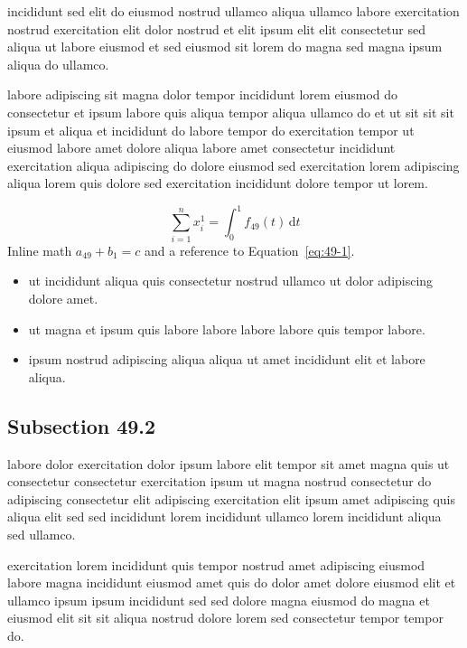 \documentclass{article}
\begin{document}
incididunt sed elit do eiusmod nostrud ullamco aliqua ullamco labore exercitation nostrud exercitation elit dolor nostrud et elit ipsum elit elit consectetur sed aliqua ut labore eiusmod et sed eiusmod sit lorem do magna sed magna ipsum aliqua do ullamco.

labore adipiscing sit magna dolor tempor incididunt lorem eiusmod do consectetur et ipsum labore quis aliqua tempor aliqua ullamco do et ut sit sit sit ipsum et aliqua et incididunt do labore tempor do exercitation tempor ut eiusmod labore amet dolore aliqua labore amet consectetur incididunt exercitation aliqua adipiscing do dolore eiusmod sed exercitation lorem adipiscing aliqua lorem quis dolore sed exercitation incididunt dolore tempor ut lorem.

\begin{equation}\label{eq:49-1}
  \sum_{i=1}^{n} x_i^{1} = \int_0^1 f_{49}(t)\,\mathrm{d}t
\end{equation}
Inline math $a_{49} + b_{1} = c$ and a reference to Equation~\eqref{eq:49-1}.

\begin{itemize}
  \item ut incididunt aliqua quis consectetur nostrud ullamco ut dolor adipiscing dolore amet.
  \item ut magna et ipsum quis labore labore labore labore quis tempor labore.
  \item ipsum nostrud adipiscing aliqua aliqua ut amet incididunt elit et labore aliqua.
\end{itemize}

\subsection{Subsection 49.2}\label{sec:49-2}
labore dolor exercitation dolor ipsum labore elit tempor sit amet magna quis ut consectetur consectetur exercitation ipsum ut magna nostrud consectetur do adipiscing consectetur elit adipiscing exercitation elit ipsum amet adipiscing quis aliqua elit sed sed incididunt lorem incididunt ullamco lorem incididunt aliqua sed ullamco.

exercitation lorem incididunt quis tempor nostrud amet adipiscing eiusmod labore magna incididunt eiusmod amet quis do dolor amet dolore eiusmod elit et ullamco ipsum ipsum incididunt sed sed dolore magna eiusmod do magna et eiusmod elit sit sit aliqua nostrud dolore lorem sed consectetur tempor tempor do.
\end{document}
